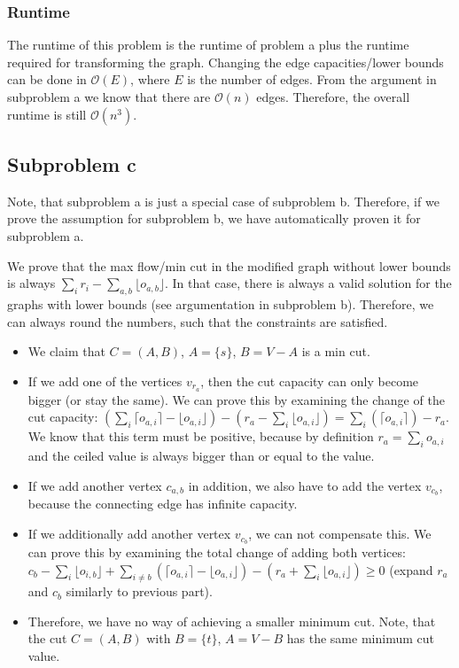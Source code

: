 \documentclass[12pt]{article}
\begin{document}
\subsubsection*{Runtime}
The runtime of this problem is the runtime of problem a plus the runtime required for transforming the graph. Changing the edge capacities/lower bounds can be done in $\mathcal{O}(E)$, where $E$ is the number of edges. From the argument in subproblem a we know that there are $\mathcal{O}(n)$ edges. Therefore, the overall runtime is still $\mathcal{O}(n^3)$.

\subsection*{Subproblem c}
Note, that subproblem a is just a special case of subproblem b. Therefore, if we prove the assumption for subproblem b, we have automatically proven it for subproblem a.

We prove that the max flow/min cut in the modified graph without lower bounds is always $\sum_i r_i - \sum_{a,b} \lfloor o_{a,b} \rfloor$. In that case, there is always a valid solution for the graphs with lower bounds (see argumentation in subproblem b). Therefore, we can always round the numbers, such that the constraints are satisfied.

\begin{itemize}
	\item We claim that $C=(A,B)$, $A=\{s\}$, $B=V-A$ is a min cut.
	\item If we add one of the vertices $v_{r_a}$, then the cut capacity can only become bigger (or stay the same). We can prove this by examining the change of the cut capacity: $(\sum_i \lceil o_{a,i} \rceil - \lfloor o_{a,i} \rfloor) - (r_a - \sum_i \lfloor o_{a,i} \rfloor) = \sum_i (\lceil o_{a,i} \rceil) - r_a$. We know that this term must be positive, because by definition $r_a = \sum_i o_{a,i}$ and the ceiled value is always bigger than or equal to the value.
	\item If we add another vertex $c_{a,b}$ in addition, we also have to add the vertex $v_{c_b}$, because the connecting edge has infinite capacity.
	\item If we additionally add another vertex $v_{c_b}$, we can not compensate this. We can prove this by examining the total change of adding both vertices: $c_b - \sum_i \lfloor o_{i, b} \rfloor + \sum_{i \not= b} (\lceil o_{a,i} \rceil - \lfloor o_{a,i} \rfloor) - (r_a + \sum_i \lfloor o_{a,i} \rfloor) \geq 0$ (expand $r_a$ and $c_b$ similarly to previous part).
	\item Therefore, we have no way of achieving a smaller minimum cut. Note, that the cut $C=(A,B)$ with $B=\{t\}$, $A=V-B$ has the same minimum cut value. 
\end{itemize}
\end{document}
